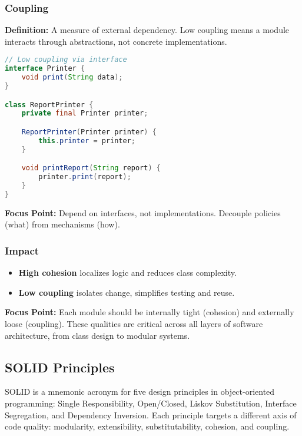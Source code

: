 \documentclass[a4paper,12pt]{article}
\begin{document}
\subsubsection{Coupling}

\textbf{Definition:} A measure of external dependency. Low coupling means a module interacts through abstractions, not concrete implementations.

\begin{lstlisting}[language=Java]
// Low coupling via interface
interface Printer {
    void print(String data);
}

class ReportPrinter {
    private final Printer printer;

    ReportPrinter(Printer printer) {
        this.printer = printer;
    }

    void printReport(String report) {
        printer.print(report);
    }
}
\end{lstlisting}

\textbf{Focus Point:} Depend on interfaces, not implementations. Decouple policies (what) from mechanisms (how).

\subsubsection{Impact}

\begin{itemize}
  \item \textbf{High cohesion} localizes logic and reduces class complexity.
  \item \textbf{Low coupling} isolates change, simplifies testing and reuse.
\end{itemize}

\textbf{Focus Point:} Each module should be internally tight (cohesion) and externally loose (coupling). These qualities are critical across all layers of software architecture, from class design to modular systems.


\subsection{SOLID Principles}

SOLID is a mnemonic acronym for five design principles in object-oriented programming: Single Responsibility, Open/Closed, Liskov Substitution, Interface Segregation, and Dependency Inversion. Each principle targets a different axis of code quality: modularity, extensibility, substitutability, cohesion, and coupling.
\end{document}
